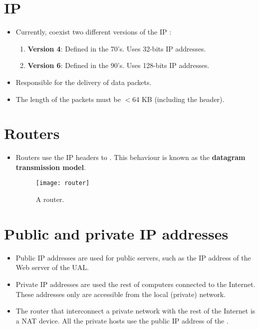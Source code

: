 \section{\gls{IP}}
\begin{itemize}
\item Currently, coexist two different versions of the IP
  \cite{wikipedia_IP}:
  \begin{enumerate}
  \item \textbf{Version 4}: Defined in the 70's. Uses 32-bits IP addresses.
  \item \textbf{Version 6}: Defined in the 90's. Uses 128-bits IP addresses.
  \end{enumerate}
\item Responsible for the  delivery of data packets.
\item The length of the packets must be $<6$4 KB (including the header).
\end{itemize}

\section{Routers}
\begin{itemize} 
\item Routers use the IP headers to . This behaviour is known as the \textbf{datagram
    transmission model}.
\begin{figure}[H]
  \vspace{1ex}
  \centering
  \texttt{[image: router]}
  \caption{A router.}
  \label{fig:router}
\end{figure}
\end{itemize}

\section{Public and private IP addresses}
\begin{itemize}
\item Public IP addresses are used for public servers, such as the IP
  address of the Web server of the UAL.
\item Private IP addresses are used the rest of computers connected to
  the Internet. These addresses only are accessible from the local
  (private) network.
\item The router that interconnect a private network with the rest of
  the Internet is a \gls{NAT} device. All the private hosts use the
  public IP address of the .
\end{itemize}

